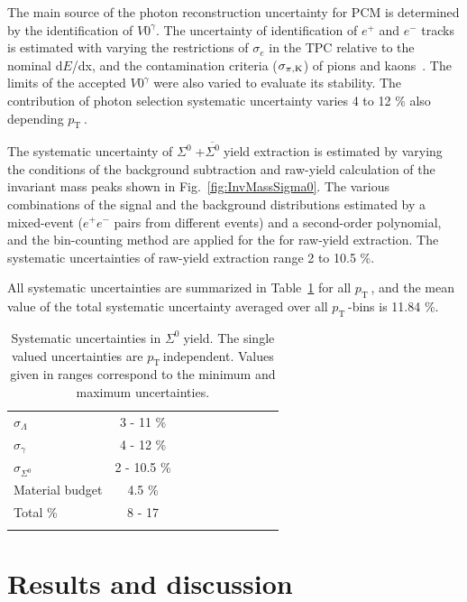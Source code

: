 \documentclass[ALICE,manyauthors]{cernphprep}
\newcommand{\sig}{\ensuremath{\Sigma^0  \; }}
\newcommand{\asig}{\ensuremath{\overline{\Sigma^0} \; }}
\newcommand{\pt}{\ensuremath{p_{\mathrm{T}\; }}}
\begin{document}
The main source of the photon reconstruction uncertainty for PCM is determined by the identification
of $V0^{\gamma}$. The uncertainty of identification of $e^+$ and $e^-$ tracks is estimated with varying 
the restrictions of $\sigma_e$ in the TPC relative to the nominal d$E$/dx, and the contamination criteria
($\sigma_{\pi,\rm{K}}$) of pions and kaons~\cite{cite:pi0-2012}. The limits of the accepted
$V0^{\gamma}$ were also varied to evaluate its stability. The contribution of photon selection 
systematic uncertainty varies 4 to 12 \% also depending \pt. 

The systematic uncertainty of \sig+\asig yield extraction is estimated by 
 varying the conditions of the background subtraction and raw-yield calculation of the invariant mass peaks
shown in Fig.~\ref{fig:InvMassSigma0}. The various combinations of the signal and the background 
distributions estimated by a mixed-event ($e^+e^-$ pairs from different events) and a second-order polynomial, 
and the bin-counting method are applied for the for raw-yield extraction. The systematic uncertainties of 
raw-yield extraction range 2 to 10.5 \%. 

All systematic uncertainties are summarized in Table~\ref{tab:sys} for all \pt, and the mean value of the total systematic 
uncertainty averaged over all $\pt$-bins is 11.84 \%. 

\begin{table}[h!]
\centering
\begin{tabular}{lccccccccc}
\hline\noalign{\smallskip}
$\sigma_{\Lambda}$                &  3 - 11 \% \\
$\sigma_{\gamma}$                &  4 - 12  \% \\
$\sigma_{\Sigma^0}$                 & 2 - 10.5  \% \\ 
Material budget       & 4.5 \% \\
\hline\noalign{\smallskip}

Total \%                 & 8 - 17 \\

\hline\noalign{\smallskip}

\end{tabular}
\caption{Systematic uncertainties in \sig yield. The single valued uncertainties are \pt independent. 
Values given in ranges correspond to the minimum and maximum uncertainties.
}
\label{tab:sys}    
\end{table} 

 \section{Results and discussion}
 \label{sec:results}
\end{document}
